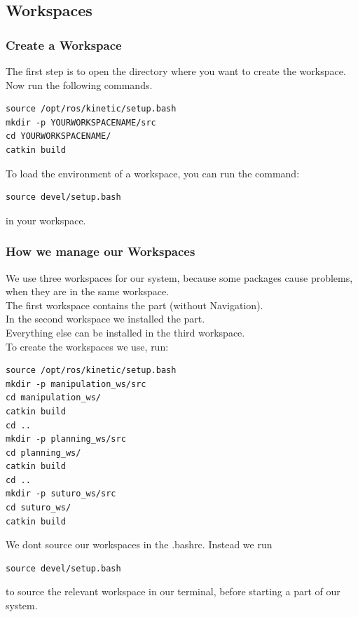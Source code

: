 \documentclass[main.tex]{subfiles}
\begin{document}
	\subsection{Workspaces}
	\subsubsection{Create a Workspace}
	The first step is to open the directory where you want to create the workspace.\\
	Now run the following commands.
	\begin{lstlisting}
source /opt/ros/kinetic/setup.bash
mkdir -p YOURWORKSPACENAME/src
cd YOURWORKSPACENAME/
catkin build 
\end{lstlisting}
	
	To load the environment of a workspace, you can run the command:
	\begin{lstlisting}
source devel/setup.bash
\end{lstlisting}
	in your workspace.
	
	\subsubsection{How we manage our Workspaces} \label{workspace_management}
	
	We use three workspaces for our system, because some packages cause problems, when they are in the same workspace.\\
	The first workspace contains the  part (without Navigation).\\
	In the second workspace we installed the  part.\\
	Everything else can be installed in the third workspace.\\
	To create the workspaces we use, run:\\
	\begin{lstlisting}
source /opt/ros/kinetic/setup.bash
mkdir -p manipulation_ws/src
cd manipulation_ws/
catkin build 
cd ..
mkdir -p planning_ws/src
cd planning_ws/
catkin build 
cd ..
mkdir -p suturo_ws/src
cd suturo_ws/
catkin build 
\end{lstlisting}
	
	We dont source our workspaces in the .bashrc. Instead we run\\
	\begin{lstlisting}
source devel/setup.bash
\end{lstlisting}
to source the relevant workspace in our terminal, before starting a part of our system.
	
\end{document}
